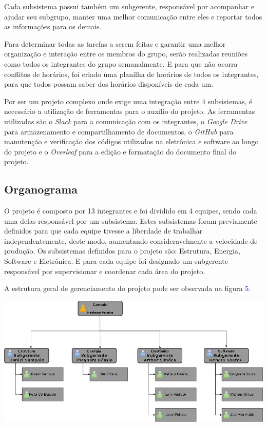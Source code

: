 	Cada subsistema possui também um subgerente, responsável por acompanhar e ajudar seu subgrupo, manter uma melhor comunicação entre eles e reportar todos as informações para os demais.
    
	Para determinar todas as tarefas a serem feitas e garantir uma melhor organização e interação entre os membros do grupo, serão realizadas reuniões como todos os integrantes do grupo semanalmente. E para que não ocorra conflitos de horários, foi criado uma planilha de horários de todos os integrantes, para que todos possam saber dos horários disponíveis de cada um. 
    
	Por ser um projeto complexo onde exige uma integração entre 4 subsistemas, é necessário a utilização de ferramentas para o auxílio do projeto. As ferramentas utilizadas são o \textit{Slack} para a comunicação com os integrantes, o \textit{Google Drive} para armazenamento e compartilhamento de documentos, o \textit{GitHub} para manutenção e verificação dos códigos utilizados na eletrônica e software ao longo do projeto e o \textit{Overleaf} para a edição e formatação do documento final do projeto.

\subsection{Organograma}

	O projeto é composto por 13 integrantes e foi dividido em 4 equipes, sendo cada uma delas responsável por um subsistema. Estes subsistemas foram previamente definidos para que cada equipe tivesse a liberdade de trabalhar independentemente, deste modo, aumentando consideravelmente a velocidade de produção. Os subsistemas definidos para o projeto são: Estrutura, Energia, Software e Eletrônica. E para cada equipe foi designado um subgerente responsável por supervisionar e coordenar cada área do projeto.
    
	A estrutura geral de gerenciamento do projeto pode ser observada na figura \textcolor{blue}{5}.
    
\begin{center}
	\includegraphics[scale=0.6]{figuras/Organograma}
\end{center} 
    

    
    

